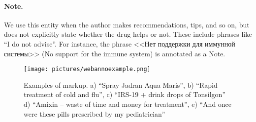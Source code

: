 \documentclass[a4paper,fleqn,longmktitle]{cas-dc}
\begin{document}
\paragraph{Note.} We use this entity when the author makes recommendations, tips, and so on, but does not explicitly state whether the drug helps or not. These include phrases like ``I do not advise''. For instance, the phrase <<Нет поддержки для иммунной системы>> (No support for the immune system) is annotated as a Note.

\begin{figure}
    \centering
    \texttt{[image: pictures/webannoexample.png]}
    \caption{Examples of markup. a) ``Spray Jadran Aqua Maris'', b) ``Rapid treatment of cold and flu'', c) ``IRS-19 + drink drops of Tonsilgon'' d) ``Amixin -- waste of time and money for treatment'', e) ``And once were these pills prescribed by my pediatrician''}
    \label{fig:webannoExample1}
\end{figure}
\end{document}
